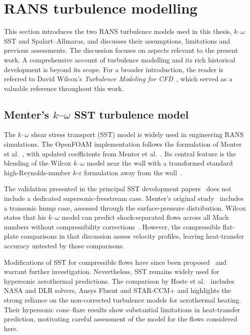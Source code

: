 \section{RANS turbulence modelling}
\label{sec:background:rans-turbulence-modelling}

This section introduces the two RANS turbulence models used in this thesis, \(k\)--\(\omega\) SST and Spalart--Allmaras, and discusses their assumptions, limitations and previous assessments. The discussion focuses on aspects relevant to the present work. A comprehensive account of turbulence modelling and its rich historical development is beyond its scope. For a broader introduction, the reader is referred to David Wilcox's \emph{Turbulence Modeling for CFD}~\cite{wilcox1998turbulence}, which served as a valuable reference throughout this work.

\subsection{Menter's \texorpdfstring{\(k\)--\(\omega\)}{k–omega} SST turbulence model}

The \(k\)--\(\omega\) shear stress transport (SST) model is widely used in engineering RANS simulations. The OpenFOAM implementation follows the formulation of Menter et al.~\cite{menter2001elements}, with updated coefficients from Menter et al.~\cite{menter2003ten}. Its central feature is the blending of the Wilcox \(k\)--\(\omega\) model near the wall with a transformed standard high-Reynolds-number \(k\)-\(\varepsilon\) formulation away from the wall~\cite{menter1994two}.
\par\medskip

The validation presented in the principal SST development papers~\cite{menter1994two,menter2001elements,menter2003ten} does not include a dedicated supersonic-freestream case. Menter's original study~\cite{menter1994two} includes a transonic hump case, assessed through the surface-pressure distribution. Wilcox states that his \(k\)--\(\omega\) model can predict shock-separated flows across all Mach numbers without compressibility corrections~\cite[p.~128 and Section~5.4.7]{wilcox1998turbulence}. However, the compressible flat-plate comparisons in that discussion assess velocity profiles, leaving heat-transfer accuracy untested by those comparisons.
\par\medskip

Modifications of SST for compressible flows have since been proposed~\cite{kim2005modified,zeng2024multi,wang2024improved} and warrant further investigation. Nevertheless, SST remains widely used for hypersonic aerothermal predictions. The comparison by Hoste et al.~\cite{hoste2025review} includes NASA and DLR solvers, Ansys Fluent and STAR-CCM+ and highlights the strong reliance on the non-corrected turbulence models for aerothermal heating. Their hypersonic cone--flare results show substantial limitations in heat-transfer prediction, motivating careful assessment of the model for the flows considered here.
\par\medskip

